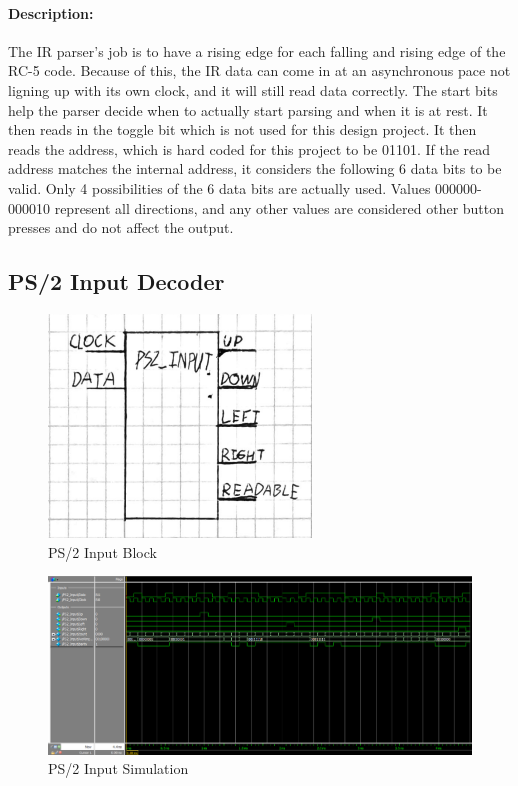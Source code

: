 \documentclass[]{article}
\begin{document}
\paragraph{Description:} The IR parser's job is to have a rising edge for each falling and rising edge of the RC-5 code. Because of this, the IR data can come in at an asynchronous pace not ligning up with its own clock, and it will still read data correctly. 
The start bits help the parser decide when to actually start parsing and when it is at rest. It then reads in the toggle bit which is not used for this design project. It then reads the address, which is  hard coded for this project to be 01101. If the read address matches the internal address, it considers the following 6 data bits to be valid.
Only 4 possibilities of the 6 data bits are actually used. Values 000000-000010 represent all directions, and any other values are considered other button presses and do not affect the output.

\subsection{PS/2 Input Decoder}
\begin{figure}[H]\centering
    \includegraphics[width=0.5\linewidth]{figures/PS2_Input_Block.png}
    \caption{PS/2 Input Block}
    \label{fig:ps2InputBlock}
\end{figure}
\begin{figure}[H]\centering
    \includegraphics[width=\linewidth]{figures/PS2_Input_Sim.png}
    \caption{PS/2 Input Simulation}
    \label{fig:ps2ParserSim}
\end{figure}
\end{document}
